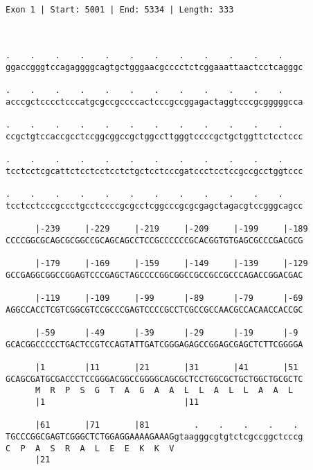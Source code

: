 \documentclass{article}
\begin{document}
 \begin{Verbatim}
 
Exon 1 | Start: 5001 | End: 5334 | Length: 333



.    .    .    .    .    .    .    .    .    .    .    .    
ggaccgggtccagaggggcagtgctgggaacgcccctctcggaaattaactcctcagggc
                                                            
.    .    .    .    .    .    .    .    .    .    .    .    
acccgctcccctcccatgcgccgccccactcccgccggagactaggtcccgcgggggcca
                                                            
.    .    .    .    .    .    .    .    .    .    .    .    
ccgctgtccaccgcctccggcggccgctggccttgggtccccgctgctggttctcctccc
                                                            
.    .    .    .    .    .    .    .    .    .    .    .    
tcctcctcgcattctcctcctcctctgctcctcccgatccctcctccgccgcctggtccc
                                                            
.    .    .    .    .    .    .    .    .    .    .    .    
tcctcctcccgccctgcctccccgcgcctcggcccgcgcgagctagacgtccgggcagcc
                                                            
      |-239     |-229     |-219     |-209     |-199     |-189
CCCCGGCGCAGCGCGGCCGCAGCAGCCTCCGCCCCCCGCACGGTGTGAGCGCCCGACGCG
                                                            
      |-179     |-169     |-159     |-149     |-139     |-129
GCCGAGGCGGCCGGAGTCCCGAGCTAGCCCCGGCGGCCGCCGCCGCCCAGACCGGACGAC
                                                            
      |-119     |-109     |-99      |-89      |-79      |-69
AGGCCACCTCGTCGGCGTCCGCCCGAGTCCCCGCCTCGCCGCCAACGCCACAACCACCGC
                                                            
      |-59      |-49      |-39      |-29      |-19      |-9 
GCACGGCCCCCTGACTCCGTCCAGTATTGATCGGGAGAGCCGGAGCGAGCTCTTCGGGGA
                                                            
      |1        |11       |21       |31       |41       |51 
GCAGCGATGCGACCCTCCGGGACGGCCGGGGCAGCGCTCCTGGCGCTGCTGGCTGCGCTC
      M  R  P  S  G  T  A  G  A  A  L  L  A  L  L  A  A  L  
      |1                            |11                     
  
      |61       |71       |81         .    .    .    .    . 
TGCCCGGCGAGTCGGGCTCTGGAGGAAAAGAAAGgtaagggcgtgtctcgccggctcccg
C  P  A  S  R  A  L  E  E  K  K  V                          
      |21                                                   
  

\end{Verbatim}
\end{document}
